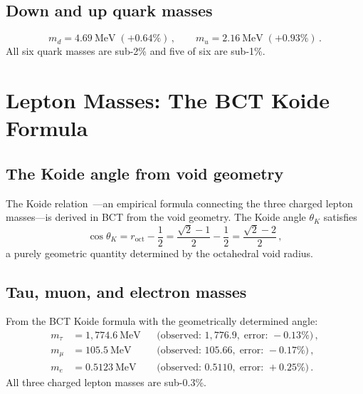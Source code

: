 \documentclass[review,number,sort&compress]{elsarticle}
\newcommand{\roct}{r_{\mathrm{oct}}}
\begin{document}
\subsection{Down and up quark masses}

\begin{equation}
  m_d = 4.69~\text{MeV}\;(+0.64\%)\,,\qquad
  m_u = 2.16~\text{MeV}\;(+0.93\%)\,.
  \label{eq:mud}
\end{equation}
All six quark masses are sub-2\% and five of six are sub-1\%.

\section{Lepton Masses: The BCT Koide Formula}
\label{sec:leptons}

\subsection{The Koide angle from void geometry}

The Koide relation~\cite{Koide1983}---an empirical formula connecting
the three charged lepton masses---is derived in BCT from the void
geometry. The Koide angle $\theta_K$ satisfies
\begin{equation}
  \cos\theta_K = \roct - \frac{1}{2}
  = \frac{\sqrt{2}-1}{2} - \frac{1}{2}
  = \frac{\sqrt{2}-2}{2}\,,
  \label{eq:koide_angle}
\end{equation}
a purely geometric quantity determined by the octahedral void radius.

\subsection{Tau, muon, and electron masses}

From the BCT Koide formula with the geometrically determined angle:
\begin{align}
  m_\tau &= 1{,}774.6~\text{MeV} &&
  \bigl(\text{observed: } 1{,}776.9,\;\text{error: } -0.13\%\bigr)\,,
  \label{eq:mtau} \\
  m_\mu &= 105.5~\text{MeV} &&
  \bigl(\text{observed: } 105.66,\;\text{error: } -0.17\%\bigr)\,,
  \label{eq:mmu} \\
  m_e &= 0.5123~\text{MeV} &&
  \bigl(\text{observed: } 0.5110,\;\text{error: } +0.25\%\bigr)\,.
  \label{eq:me}
\end{align}
All three charged lepton masses are sub-0.3\%.
\end{document}
